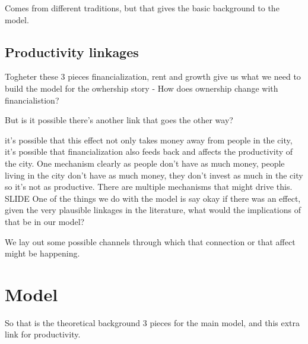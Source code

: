 \documentclass[]{article}
\begin{document}
Comes from different traditions, but that gives the basic background to the model.


\subsection{Productivity linkages}

Togheter these 3 pieces financialization, rent and growth give us what we need to build the model for the owhership story - How does ownership change with financialistion?


But is it possible there's another link that goes the other way?

it's  possible that this effect not only takes money away from people in the city, it's possible that financialization also feeds back and  affects the productivity of the city. One mechanism clearly as people don't have as much money, people living in the city don't have as much money, they don't invest as much in the city so it's not as productive. 
There are multiple mechanisms that might drive this. SLIDE
One of the things we do with the model is say okay if there was an effect, given the very plausible linkages in the literature, what would the implications of that be in our model?

We lay out some possible channels through which that connection or that affect might be happening.

\section{Model}

So that is the theoretical background 3 pieces for the main model, and this extra link for productivity. 
\end{document}

